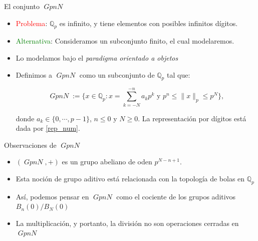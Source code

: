 \documentclass{beamer}
\theoremstyle{definition}
\numberwithin{equation}{section}
\newcommand{\tit}[1]{\textit{#1}}
\newcommand{\red}[1]{\textcolor{red}{#1}}
\renewcommand{\geq}{\geqslant}
\renewcommand{\leq}{\leqslant}
\newcommand{\Qp}{\mathbb{Q}_p}
\newcommand{\pnorm}[1]{\|#1\|_p}
\DeclareMathOperator{\gpn}{\mathit{{GpnN}}}
\begin{document}
\begin{frame}{El conjunto $\gpn$}
	\begin{itemize}[<+- | alert@+>]
		\item \red{Problema}: $\Qp$ es infinito, y tiene elementos con posibles infinitos dígitos.
		\item \textcolor{green}{Alternativa}: Consideramos un subconjunto finito, el cual modelaremos.
		\item Lo modelamos bajo el \tit{paradigma orientado a objetos}
		\item Definimos a $\gpn$ como un subconjunto de $\Qp$ tal que:
		
		
		
		\begin{equation}\label{GpnN}
		\gpn := \Big\{x\in \Qp : x = \sum_{k=-N}^{-n} a_{k} p^{k} \text{ y } p^{n}\leq \pnorm{x}\leq p^N\Big \},
		\end{equation}
		
		donde $a_k\in \{0,\cdots,p-1\}$, $n\leq0$ y $N\geq 0$. La representación por dígitos está dada por \ref{rep_num}.
		
	\end{itemize}
\end{frame}

\begin{frame}{Observaciones de $\gpn$}
	\begin{itemize}[<+- | alert@+>]
		\item $   (\gpn,+)$ es un grupo abeliano de oden $p^{N-n+1}$.
		\item Esta noción de grupo aditivo está relacionada con la topología de bolas en $\Qp$
		\item Así, podemos pensar en $\gpn$ como el cociente de los grupos aditivos $B_n   (0)/B_N   (0)$
		\item  La  multiplicación, y portanto, la división no son operaciones cerradas en $\gpn$
	\end{itemize}
\end{frame}
\end{document}
